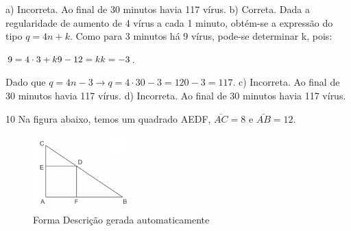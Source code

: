 \begin{escolha}
\begin{boxmedio}
\begin{boxmedio}
{\begin{boxpeq}
\begin{boxpeq}
{\begin{boxpeq}
\begin{boxmedio}
\begin{boxmedio}
\begin{boxpeq}
\begin{boxmedio}
\begin{boxpeq}
\begin{boxpeq}
\begin{boxpeq}
\begin{boxpeq}
\begin{boxmedio}
{\begin{boxmedio}
\begin{boxmedio}
\begin{boxpeq}
\begin{boxmedio}
\begin{boxpeq}
\begin{boxpeq}
\begin{boxpeq}
\begin{escolha}
{\begin{boxmedio}
\begin{boxpeq}
\begin{boxpeq}
\begin{boxpeq}
\begin{boxpeq}
\begin{boxpeq}
\begin{boxmedio}
\begin{boxpeq}
\begin{boxpeq}
\begin{boxpeq}
{\begin{boxpeq}
\begin{boxmedio}
\begin{boxpeq}
\begin{boxpeq}
\begin{boxpeq}
{\begin{boxpeq}
\begin{boxmedio}
{\begin{boxpeq}
\begin{boxpeq}
\begin{boxmedio}
\begin{boxmedio}
\begin{boxpeq}
\begin{boxpeq}
{\begin{boxpeq}
\begin{boxpeq}
\begin{boxpeq}
\begin{boxpeq}
\begin{boxpeq}
\begin{escolha}
\begin{escolha}
{\begin{boxmedio}
\begin{boxpeq}
\begin{q°}
\begin{boxmedio}
\begin{boxpeq}
\begin{boxpeq}
\begin{boxmedio}
\begin{boxmedio}
\begin{boxmedio}
\begin{boxmedio}
{\begin{escolha}
\begin{escolha}
\begin{escolha}
\begin{escolha}
\begin{escolha}
\begin{escolha}
{a) Incorreta. Ao final de 30 minutos havia 117 vírus.
b) Correta. Dada a regularidade de aumento de 4 vírus a cada 1 minuto, obtém-se 
a expressão do tipo $q = 4n + k$. Como para 3 minutos há
9 vírus, pode-se determinar k, pois: 

$9 = 4 \cdot3 + k \\
9 - 12 = k \\ 
k = - 3$.

Dado que $q = 4n - 3 \rightarrow q = 4 \cdot30 - 3 = 120 - 3 = 117$.
c) Incorreta. Ao final de 30 minutos havia 117 vírus.
d) Incorreta. Ao final de 30 minutos havia 117 vírus.}

\num{10} Na figura abaixo, temos um quadrado AEDF, $\bar{AC} = 8$ e $\bar{AB} = 12$.

\begin{figure}
\centering
\includegraphics[width=1.46354in,height=1.13788in]{./_SAEB_9_MAT/media/image267.png}
\caption{Forma Descrição gerada automaticamente}

\end{figure}
\end{escolha}
\end{escolha}
\end{escolha}
\end{escolha}
\end{escolha}
\end{escolha}}
\end{boxmedio}
\end{boxmedio}
\end{boxmedio}
\end{boxmedio}
\end{boxpeq}
\end{boxpeq}
\end{boxmedio}
\end{q°}
\end{boxpeq}
\end{boxmedio}}
\end{escolha}
\end{escolha}
\end{boxpeq}
\end{boxpeq}
\end{boxpeq}
\end{boxpeq}
\end{boxpeq}}
\end{boxpeq}
\end{boxpeq}
\end{boxmedio}
\end{boxmedio}
\end{boxpeq}
\end{boxpeq}}
\end{boxmedio}
\end{boxpeq}}
\end{boxpeq}
\end{boxpeq}
\end{boxpeq}
\end{boxmedio}
\end{boxpeq}}
\end{boxpeq}
\end{boxpeq}
\end{boxpeq}
\end{boxmedio}
\end{boxpeq}
\end{boxpeq}
\end{boxpeq}
\end{boxpeq}
\end{boxpeq}
\end{boxmedio}}
\end{escolha}
\end{boxpeq}
\end{boxpeq}
\end{boxpeq}
\end{boxmedio}
\end{boxpeq}
\end{boxmedio}
\end{boxmedio}}
\end{boxmedio}
\end{boxpeq}
\end{boxpeq}
\end{boxpeq}
\end{boxpeq}
\end{boxmedio}
\end{boxpeq}
\end{boxmedio}
\end{boxmedio}
\end{boxpeq}}
\end{boxpeq}
\end{boxpeq}}
\end{boxmedio}
\end{boxmedio}
\end{escolha}
